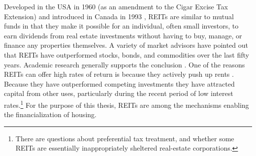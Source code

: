 Developed in the USA  in 1960 (as an amendment to the Cigar Excise Tax Extension) and introduced in Canada in 1993 \cite{batRolePublicREITs2022}, REITs are similar to mutual funds in that they make it possible for an individual, often small investors, to earn dividends from real estate investments without having to buy, manage, or finance any properties themselves. 
A variety of market advisors have pointed out that  REITs have outperformed stocks, bonds, and commodities  over the last fifty years. Academic research generally supports the conclusion \cite{changREITsOutperformStocks2008, blockInvestingREITsReal2012, chanRiskReturnReal1990}.%
One of the reasons REITs can offer high rates of return is because they actively push up rents %
\cite{augustGentrificationSuburbanDecline2018, farhaReportFinancializationHousing2017}. 
 Because they have outperformed competing investments they have attracted capital from other uses, particularly during the recent period of low interest rates.\footnote{There are questions about preferential tax treatment, and whether some REITs are essentially inappropriately sheltered real-estate corporations.} For the purpose of this thesis, REITs are among the mechanisms enabling the financialization of housing.





